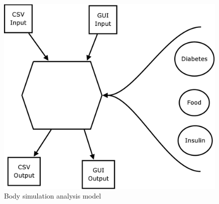 \begin{figure}[htb]
\centering
\includegraphics[scale=0.4]{images/Body_Simulation_analysis_model.pdf}
\caption{Body simulation analysis model}
\label{fig:body_sim_analysis_model}
\end{figure}